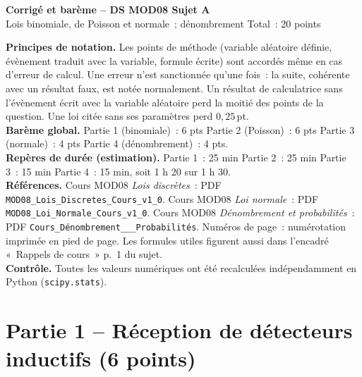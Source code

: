 \documentclass[a4paper,11pt]{article}
\newcommand{\LD}{Cours MOD08 \textit{Lois discrètes}}
\newcommand{\LN}{Cours MOD08 \textit{Loi normale}}
\newcommand{\CD}{Cours MOD08 \textit{Dénombrement et probabilités}}
\begin{document}
\begin{tcolorbox}[colback=uimmred, colframe=uimmred, sharp corners, boxrule=0pt,
  left=14pt, right=14pt, top=10pt, bottom=10pt]
{\color{white}\LARGE\bfseries Corrigé et barème -- DS MOD08 \hfill Sujet A}\\[4pt]
{\color{white}\large Lois binomiale, de Poisson et normale~; dénombrement \hfill Total~: 20 points}
\end{tcolorbox}

\begin{tcolorbox}[colback=uimmlightgray, colframe=uimmgray, boxrule=0.8pt, arc=3pt]
\small\textbf{Principes de notation.} Les points de méthode (variable aléatoire définie, évènement traduit avec la variable, formule écrite) sont accordés même en cas d'erreur de calcul. Une erreur n'est sanctionnée qu'une fois~: la suite, cohérente avec un résultat faux, est notée normalement. Un résultat de calculatrice sans l'évènement écrit avec la variable aléatoire perd la moitié des points de la question. Une loi citée sans ses paramètres perd $0{,}25$\,pt.\\[3pt]
\textbf{Barème global.} Partie 1 (binomiale)~: 6 pts \quad Partie 2 (Poisson)~: 6 pts \quad Partie 3 (normale)~: 4 pts \quad Partie 4 (dénombrement)~: 4 pts.\\[3pt]
\textbf{Repères de durée (estimation).} Partie 1~: 25 min \quad Partie 2~: 25 min \quad Partie 3~: 15 min \quad Partie 4~: 15 min, soit 1 h 20 sur 1 h 30.\\[3pt]
\textbf{Références.} \LD{}~: PDF \texttt{MOD08\_Lois\_Discretes\_Cours\_v1\_0}. \LN{}~: PDF \texttt{MOD08\_Loi\_Normale\_Cours\_v1\_0}. \CD{}~: PDF \texttt{Cours\_Dénombrement\_\_\_Probabilités}. Numéros de page~: numérotation imprimée en pied de page. Les formules utiles figurent aussi dans l'encadré «~Rappels de cours~» p.~1 du sujet.\\[3pt]
\textbf{Contrôle.} Toutes les valeurs numériques ont été recalculées indépendamment en Python (\texttt{scipy.stats}).
\end{tcolorbox}

\needspace{9cm}
\section{Partie 1 -- Réception de détecteurs inductifs (6 points)}
\end{document}

